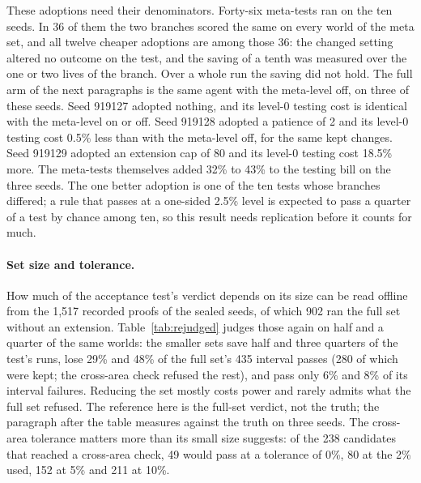 \documentclass[11pt]{article}
\begin{document}
These adoptions need their denominators. Forty-six meta-tests ran on the ten seeds. In 36 of them the two branches scored the same on every world of the meta set, and all twelve cheaper adoptions are among those 36: the changed setting altered no outcome on the test, and the saving of a tenth was measured over the one or two lives of the branch. Over a whole run the saving did not hold. The full arm of the next paragraphs is the same agent with the meta-level off, on three of these seeds. Seed 919127 adopted nothing, and its level-0 testing cost is identical with the meta-level on or off. Seed 919128 adopted a patience of 2 and its level-0 testing cost 0.5\% less than with the meta-level off, for the same kept changes. Seed 919129 adopted an extension cap of 80 and its level-0 testing cost 18.5\% more. The meta-tests themselves added 32\% to 43\% to the testing bill on the three seeds. The one better adoption is one of the ten tests whose branches differed; a rule that passes at a one-sided 2.5\% level is expected to pass a quarter of a test by chance among ten, so this result needs replication before it counts for much.





\paragraph{Set size and tolerance.} How much of the acceptance test's verdict depends on its size can be read offline from the 1,517 recorded proofs of the sealed seeds, of which 902 ran the full set without an extension. Table~\ref{tab:rejudged} judges those again on half and a quarter of the same worlds: the smaller sets save half and three quarters of the test's runs, lose 29\% and 48\% of the full set's 435 interval passes (280 of which were kept; the cross-area check refused the rest), and pass only 6\% and 8\% of its interval failures. Reducing the set mostly costs power and rarely admits what the full set refused. The reference here is the full-set verdict, not the truth; the paragraph after the table measures against the truth on three seeds. The cross-area tolerance matters more than its small size suggests: of the 238 candidates that reached a cross-area check, 49 would pass at a tolerance of 0\%, 80 at the 2\% used, 152 at 5\% and 211 at 10\%.


\end{document}
